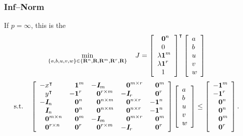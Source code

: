 \documentclass{article}
\begin{document}
\subsubsection{Inf--Norm}

    If $p=\infty$, this is the \LP 
    \begin{align*}
        \min_{\{a,b,u,v,w\}\in\{\textbf{R}^n,\textbf{R},\textbf{R}^m,\textbf{R}^r,\textbf{R}\}}  \quad J 
        & = \left[\begin{array}{lllllllllllllllllll}
            \phantom{\lambda}\textbf{0}^{n}\\
            \phantom{\lambda}0\\
            \lambda\textbf{1}^{m}\\
            \lambda\textbf{1}^{r}\\
            \phantom{\lambda}1
        \end{array}\right]^\intercal
        \left[\begin{array}{lllllllllllllllllll}
            a\\
            b\\
            u\\
            v\\
            w
        \end{array}\right]
    \end{align*}
    \begin{align*}
        \st\quad
        \mat{
                -x^\tp
            &
                \minus \ones^m
            &
                - \eye_m
            &   
                \minus \zeros^{m\times r}
            &
                \minus \zeros^m
            \\
                \minus y^\tp
            &
                -\ones^r
            &
                \minus \zeros^{r\times m}
            &
                - \eye_r
            &
                \minus \zeros^r
            \\
            -\eye_n & \minus \zeros^{n} & \minus \zeros^{n\times m} & \minus \zeros^{n\times r} & -\ones^n
            \\
            \minus \eye_n & \minus \zeros^n & \minus \zeros^{n\times m} &\minus \zeros^{n\times r} & -\ones^n
            \\
            \minus \zeros^{m\times n} & \minus \zeros^m & -\eye_m & \minus \zeros^{m\times r} & \minus \zeros^{m}
            \\
            \minus \zeros^{r\times n} & \minus \zeros^r & \minus \zeros^{r\times m} & -\eye_r & \minus \zeros^{r}
            }
        &\mat{a \\ b \\ u \\ v \\ w}
        \leq
        \mat{ -\ones^m \\ -\ones^r \\ \minus \zeros^n \\ \minus \zeros^n \\ \minus\zeros^m \\ \minus\zeros^r}.
    \end{align*}
\end{document}

